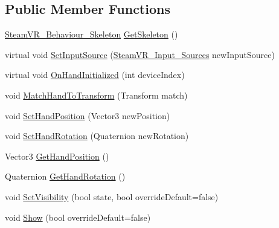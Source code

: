 \subsection*{Public Member Functions}
\begin{DoxyCompactItemize}
\item 
\mbox{\hyperlink{class_valve_1_1_v_r_1_1_steam_v_r___behaviour___skeleton}{Steam\+V\+R\+\_\+\+Behaviour\+\_\+\+Skeleton}} \mbox{\hyperlink{class_valve_1_1_v_r_1_1_interaction_system_1_1_render_model_a8e71c6a1a4f03b1074641b441a0e7ff7}{Get\+Skeleton}} ()
\item 
virtual void \mbox{\hyperlink{class_valve_1_1_v_r_1_1_interaction_system_1_1_render_model_a07fc5bd85be1388fdef18cf688e0537e}{Set\+Input\+Source}} (\mbox{\hyperlink{namespace_valve_1_1_v_r_a82e5bf501cc3aa155444ee3f0662853f}{Steam\+V\+R\+\_\+\+Input\+\_\+\+Sources}} new\+Input\+Source)
\item 
virtual void \mbox{\hyperlink{class_valve_1_1_v_r_1_1_interaction_system_1_1_render_model_a56500ea3c06b70bf4089032eb04e3fef}{On\+Hand\+Initialized}} (int device\+Index)
\item 
void \mbox{\hyperlink{class_valve_1_1_v_r_1_1_interaction_system_1_1_render_model_a040cf81706709d85a9b649e35e09ca8a}{Match\+Hand\+To\+Transform}} (Transform match)
\item 
void \mbox{\hyperlink{class_valve_1_1_v_r_1_1_interaction_system_1_1_render_model_afd8e4c54e22c6f304d60bf69866997bb}{Set\+Hand\+Position}} (Vector3 new\+Position)
\item 
void \mbox{\hyperlink{class_valve_1_1_v_r_1_1_interaction_system_1_1_render_model_aea01b10d71171bad63b90e951034a8dc}{Set\+Hand\+Rotation}} (Quaternion new\+Rotation)
\item 
Vector3 \mbox{\hyperlink{class_valve_1_1_v_r_1_1_interaction_system_1_1_render_model_a6b961d329879fa9af2745059b3b40121}{Get\+Hand\+Position}} ()
\item 
Quaternion \mbox{\hyperlink{class_valve_1_1_v_r_1_1_interaction_system_1_1_render_model_a1d8de178c09dcc9e25f6e210052ef3e7}{Get\+Hand\+Rotation}} ()
\item 
void \mbox{\hyperlink{class_valve_1_1_v_r_1_1_interaction_system_1_1_render_model_aa9e3d09412f8950b91a77ad1f0aa4cf1}{Set\+Visibility}} (bool state, bool override\+Default=false)
\item 
void \mbox{\hyperlink{class_valve_1_1_v_r_1_1_interaction_system_1_1_render_model_a913c8faf30f0eac4a2823c34eca00968}{Show}} (bool override\+Default=false)
\item 

\end{DoxyCompactItemize}
